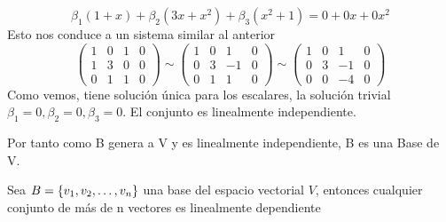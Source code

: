 \[\beta_1(1+x)+
\beta_2(3x+x^2)+
\beta_3(x^2+1)=
0+0x+0x^2\]
Esto nos conduce a un sistema similar al anterior
\[
\left(
\begin{array}{rrr|r}
1&0&1&0\\
1&3&0&0\\
0&1&1&0
\end{array}
\right)
\sim
\left(
\begin{array}{rrr|r}
1&0&1&0\\
0&3&-1&0\\
0&1&1&0
\end{array}
\right)
\sim
\left(
\begin{array}{rrr|r}
1&0&1&0\\
0&3&-1&0\\
0&0&-4&0
\end{array}
\right)
\]
Como vemos, tiene soluci\'on \'unica para los escalares, la soluci\'on trivial $\beta_1=0, \beta_2=0, \beta_3=0$. El conjunto es linealmente independiente.


Por tanto como B genera a V y es linealmente independiente, B es una Base de V.



\begin{theorem}\label{th_masde_n}
Sea $B= \lbrace v_1, v_2, \ldots, v_n \rbrace$ una base del espacio vectorial $V$, entonces cualquier conjunto de m\'as de n vectores es linealmente dependiente

\end{theorem}

